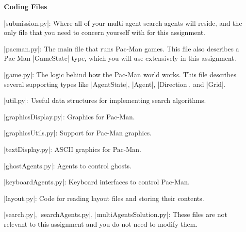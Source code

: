 {\bf Coding Files}

|submission.py|: Where all of your multi-agent search agents will reside, and
the only file that you need to concern yourself with for this assignment.

|pacman.py|: The main file that runs Pac-Man games. This file also describes a
Pac-Man |GameState| type, which you will use extensively in this assignment.

|game.py|: The logic behind how the Pac-Man world works. This file describes
several supporting types like |AgentState|, |Agent|, |Direction|, and |Grid|.

|util.py|: Useful data structures for implementing search algorithms.

|graphicsDisplay.py|: Graphics for Pac-Man.

|graphicsUtils.py|: Support for Pac-Man graphics.

|textDisplay.py|: ASCII graphics for Pac-Man.

|ghostAgents.py|: Agents to control ghosts.

|keyboardAgents.py|: Keyboard interfaces to control Pac-Man.

|layout.py|: Code for reading layout files and storing their contents.

|search.py|, |searchAgents.py|, |multiAgentsSolution.py|: These files are not
relevant to this assignment and you do not need to modify them.
